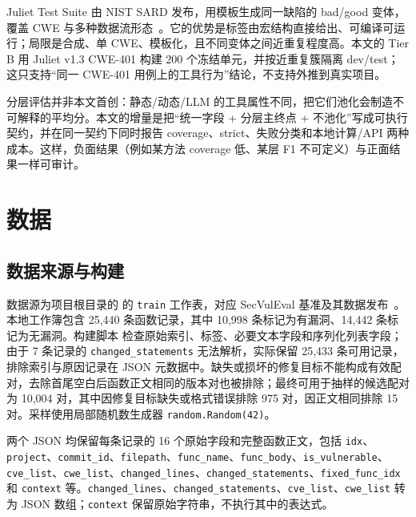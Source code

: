 \documentclass[conference]{IEEEtran}
\begin{document}
Juliet Test Suite 由 NIST SARD 发布，用模板生成同一缺陷的 bad/good 变体，覆盖 CWE 与多种数据流形态~\cite{boland2012juliet,sard}。它的优势是标签由宏结构直接给出、可编译可运行；局限是合成、单 CWE、模板化，且不同变体之间近重复程度高。本文的 Tier B 用 Juliet v1.3 CWE-401 构建 200 个冻结单元，并按近重复簇隔离 dev/test；这只支持“同一 CWE-401 用例上的工具行为”结论，不支持外推到真实项目。

分层评估并非本文首创：静态/动态/LLM 的工具属性不同，把它们池化会制造不可解释的平均分。本文的增量是把“统一字段 + 分层主终点 + 不池化”写成可执行契约，并在同一契约下同时报告 coverage、strict、失败分类和本地计算/API 两种成本。这样，负面结果（例如某方法 coverage 低、某层 F1 不可定义）与正面结果一样可审计。

\section{数据}
\label{sec:data}

\subsection{数据来源与构建}
数据源为项目根目录的  的 \texttt{train} 工作表，对应 SecVulEval 基准及其数据发布~\cite{ahmed2026secvuleval,secvulevaldata}。本地工作簿包含 25{,}440 条函数记录，其中 10{,}998 条标记为有漏洞、14{,}442 条标记为无漏洞。构建脚本  检查原始索引、标签、必要文本字段和序列化列表字段；由于 7 条记录的 \texttt{changed\_statements} 无法解析，实际保留 25{,}433 条可用记录，排除索引与原因记录在 JSON 元数据中。缺失或损坏的修复目标不能构成有效配对，去除首尾空白后函数正文相同的版本对也被排除；最终可用于抽样的候选配对为 10{,}004 对，其中因修复目标缺失或格式错误排除 975 对，因正文相同排除 15 对。采样使用局部随机数生成器 \texttt{random.Random(42)}。

两个 JSON 均保留每条记录的 16 个原始字段和完整函数正文，包括 \texttt{idx}、\texttt{project}、\texttt{commit\_id}、\texttt{filepath}、\texttt{func\_name}、\texttt{func\_body}、\texttt{is\_vulnerable}、\texttt{cve\_list}、\texttt{cwe\_list}、\texttt{changed\_lines}、\texttt{changed\_statements}、\texttt{fixed\_func\_idx} 和 \texttt{context} 等。\texttt{changed\_lines}、\texttt{changed\_statements}、\texttt{cve\_list}、\texttt{cwe\_list} 转为 JSON 数组；\texttt{context} 保留原始字符串，不执行其中的表达式。
\end{document}
